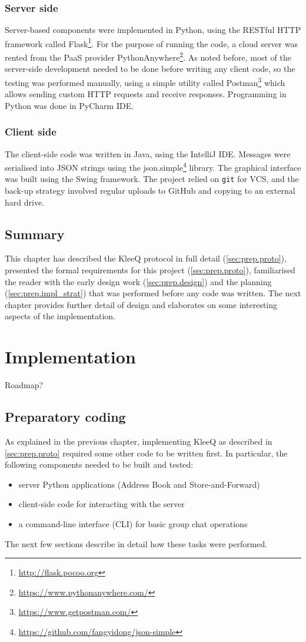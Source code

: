 \documentclass[a4paper, 12pt]{report}
\begin{document}
\subsection{Server side}
Server-based components were implemented in Python, using the RESTful HTTP framework called Flask\footnote{\url{http://flask.pocoo.org}}. For the purpose of running the code, a cloud server was rented from the PaaS provider PythonAnywhere\footnote{\url{https://www.pythonanywhere.com/}}. As noted before, most of the server-side development needed to be done before writing any client code, so the testing was performed manually, using a simple utility called Postman\footnote{\url{https://www.getpostman.com/}} which allows sending custom HTTP requests and receive responses. Programming in Python was done in PyCharm IDE.

\subsection{Client side}
The client-side code was written in Java, using the IntelliJ IDE. Messages were serialised into JSON strings using the json.simple\footnote{\url{https://github.com/fangyidong/json-simple}} library. The graphical interface was built using the Swing framework. The project relied on \texttt{git} for VCS, and the back-up strategy involved regular uploads to GitHub and copying to an external hard drive.

\section{Summary}
This chapter has described the KleeQ protocol in full detail (\cref{sec:prep.proto}), presented the formal requirements for this project (\cref{sec:prep.proto}), familiarised the reader with the early design work (\cref{sec:prep.design}) and the planning (\cref{sec:prep.impl_strat}) that was performed before any code was written. The next chapter provides further detail of design and elaborates on some interesting aspects of the implementation.



\chapter{Implementation}
{\color{red} Roadmap?}
\section{Preparatory coding}
As explained in the previous chapter, implementing KleeQ as described in \cref{sec:prep.proto} required some other code to be written first. In particular, the following components needed to be built and tested:
\begin{itemize}
    \item server Python applications (Address Book and Store-and-Forward)
    \item client-side code for interacting with the server
    \item a command-line interface (CLI) for basic group chat operations
\end{itemize}
The next few sections describe in detail how these tasks were performed.
\end{document}

